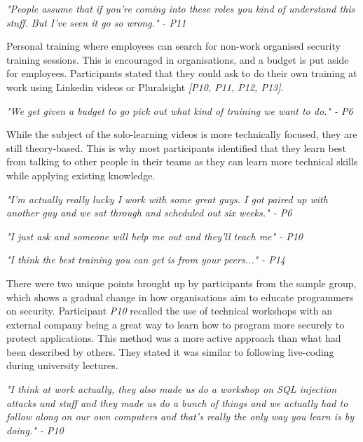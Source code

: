 \newline
\par 
\textit{"People assume that if you're coming into these roles you kind of understand this stuff. But I've seen it go so wrong." - P11}
\newline
\par
Personal training where employees can search for non-work organised security training sessions. This is encouraged in organisations, and a budget is put aside for employees. Participants stated that they could ask to do their own training at work using Linkedin videos or Pluralsight \textit{[P10, P11, P12, P13]}. 
\newline
\par
\textit{"We get given a budget to go pick out what kind of training we want to do." - P6}
\newline
\par 
While the subject of the solo-learning videos is more technically focused, they are still theory-based. This is why most participants identified that they learn best from talking to other people in their teams as they can learn more technical skills while applying existing knowledge. 
\newline
\par
\textit{"I'm actually really lucky I work with some great guys. I got paired up with another guy and we sat through and scheduled out six weeks." - P6}
\newline
\par
\textit{"I just ask and someone will help me out and they'll teach me" - P10}
\newline
\par
\textit{"I think the best training you can get is from your peers..." - P14 }
\newline
\par
There were two unique points brought up by participants from the sample group, which shows a gradual change in how organisations aim to educate programmers on security. Participant \textit{P10} recalled the use of technical workshops with an external company being a great way to learn how to program more securely to protect applications. This method was a more active approach than what had been described by others. They stated it was similar to following live-coding during university lectures. 
\newline
\par
\textit{"I think at work actually, they also made us do a workshop on SQL injection attacks and stuff and they made us do a bunch of things and we actually had to follow along on our own computers and that's really the only way you learn is by doing." - P10}
